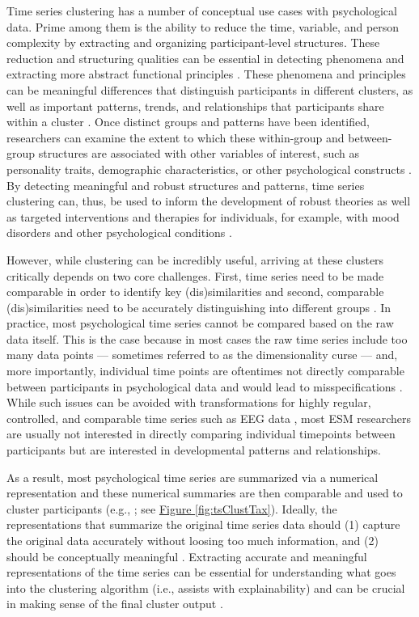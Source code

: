 \documentclass[man, 12pt, a4paper, floatsintext]{apa7}
\theoremstyle{break}
\theoremstyle{plain}
\newcommand{\fgrref}[2][]{\hyperref[#2]{Figure \ref*{#2}#1}}
\begin{document}
Time series clustering has a number of conceptual use cases with psychological data. Prime among them is the ability to reduce the time, variable, and person complexity by extracting and organizing participant-level structures. These reduction and structuring qualities can be essential in detecting phenomena and extracting more abstract functional principles \citep[][]{eronen2021a}. These phenomena and principles can be meaningful differences that distinguish participants in different clusters, as well as important patterns, trends, and relationships that participants share within a cluster \citep[e.g.,][]{schrodt2000}. Once distinct groups and patterns have been identified, researchers can examine the extent to which these within-group and between-group structures are associated with other variables of interest, such as personality traits, demographic characteristics, or other psychological constructs \citep[e.g.,][]{monden2022}. By detecting meaningful and robust structures and patterns, time series clustering can, thus, be used to inform the development of robust theories as well as targeted interventions and therapies for individuals, for example, with mood disorders and other psychological conditions \citep[e.g.,][]{borsboom2021, eronen2020}.

However, while clustering can be incredibly useful, arriving at these clusters critically depends on two core challenges. First, time series need to be made comparable in order to identify key (dis)similarities and second, comparable (dis)similarities need to be accurately distinguishing into different groups \citep[e.g.,][]{Aghabozorgi2015}. In practice, most psychological time series cannot be compared based on the raw data itself. This is the case because in most cases the raw time series include too many data points --- sometimes referred to as the dimensionality curse \citep[e.g.,][]{altman2018} --- and, more importantly, individual time points are oftentimes not directly comparable between participants in psychological data and would lead to misspecifications \citep[e.g., ][]{faloutsos1994}. While such issues can be avoided with transformations for highly regular, controlled, and comparable time series such as EEG data \citep[e.g.,][]{huang1985}, most ESM researchers are usually not interested in directly comparing individual timepoints between participants but are interested in developmental patterns and relationships. 

As a result, most psychological time series are summarized via a numerical representation and these numerical summaries are then comparable and used to cluster participants (e.g., \citealp[]{timmerman2013}; see \fgrref{fig:tsClustTax}). Ideally, the representations that summarize the original time series data should (1) capture the original data accurately without loosing too much information, and (2) should be conceptually meaningful \citep[][]{vandermaaten2009}. Extracting accurate and meaningful representations of the time series can be essential for understanding what goes into the clustering algorithm (i.e., assists with explainability) and can be crucial in making sense of the final cluster output \citep[i.e., assists with interpretability; e.g.,][]{Kennedy2021}. 
\end{document}
